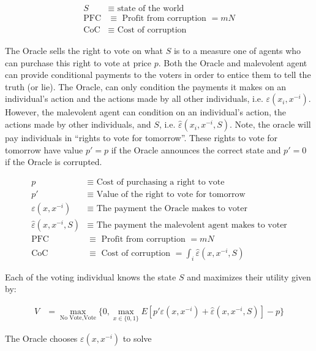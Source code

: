 \documentclass[12pt]{article}
\begin{document}
  \begin{align*}
    S &\equiv \text{ state of the world} \\
    \text{PFC} &\equiv \text{ Profit from corruption } = mN \\
    \text{CoC} &\equiv \text{ Cost of corruption }
  \end{align*}

  The Oracle sells the right to vote on what $S$ is to a measure one of agents who can purchase this
  right to vote at price $p$. Both the Oracle and malevolent agent can provide conditional payments
  to the voters in order to entice them to tell the truth (or lie). The Oracle, can only condition
  the payments it makes on an individual's action and the actions made by all other individuals,
  i.e. $\varepsilon(x_i, x^{-i})$. However, the malevolent agent can condition on an individual's
  action, the actions made by other individuals, and $S$, i.e. $\hat{\varepsilon}(x_i, x^{-i}, S)$.
  Note, the oracle will pay individuals in ``rights to vote for tomorrow''. These rights to vote for
  tomorrow have value $p' = p$ if the Oracle announces the correct state and $p' = 0$ if the Oracle
  is corrupted.

  \begin{align*}
    p &\equiv \text{ Cost of purchasing a right to vote} \\
    p' &\equiv \text{ Value of the right to vote for tomorrow} \\
    \varepsilon(x, x^{-i}) &\equiv \text{ The payment the Oracle makes to voter } \\
    \hat{\varepsilon}(x, x^{-i}, S) &\equiv \text{ The payment the malevolent agent makes to voter} \\
    \text{PFC} &\equiv \text{ Profit from corruption } = mN \\
    \text{CoC} &\equiv \text{ Cost of corruption } = \int_i \hat{\varepsilon}(x, x^{-i}, S)
  \end{align*}

  Each of the voting individual knows the state $S$ and maximizes their utility given by:

  \begin{align*}
    V &= \max_{\text{No Vote}, \text{Vote}} \{ 0, \max_{x \in \{0, 1\}} E \left[ p' \varepsilon(x, x^{-i}) + \hat{\varepsilon}(x, x^{-i}, S)\right] - p\}
  \end{align*}

  The Oracle chooses $\varepsilon(x, x^{-i})$ to solve
\end{document}
